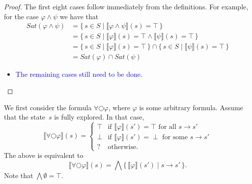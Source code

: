 \documentclass[12pt]{article}
\newcommand{\nxt}{\bigcirc}
\theoremstyle{definition}
\newcommand{\satisfaction}[1]{\llbracket #1 \rrbracket}
\begin{document}
\color{red}
\begin{proof}
The first eight cases follow immediately from the definitions.  For example, for the case $\varphi \wedge \psi$ we have that
\begin{align*}
\mathit{Sat}(\varphi \wedge \psi) 
& = \{\, s \in S \mid \satisfaction{\varphi \wedge \psi}(s) = \top \,\}\\
& = \{\, s \in S \mid \satisfaction{\varphi}(s) = \top \wedge \satisfaction{\psi}(s) = \top \,\}\\
& = \{\, s \in S \mid \satisfaction{\varphi}(s) = \top \,\} \cap \{\, s \in S \mid \satisfaction{\psi}(s) = \top \,\}\\
& = \mathit{Sat}(\varphi) \cap \mathit{Sat}(\psi)
\end{align*}
\begin{itemize}
\item 
\textcolor{blue}{The remaining cases still need to be done.}
\end{itemize}

\end{proof}
\color{black}

We first consider the formula $\forall \nxt \varphi$, where $\varphi$ is some arbitrary formula.  Assume that the state~$s$ is fully explored.  In that case,
\[
\satisfaction{\forall \nxt \varphi}(s) = \left \{
\begin{array}{ll}
\top & \mbox{if $\satisfaction{\varphi}(s') = \top$ for all $s \rightarrow s'$}\\
\perp & \mbox{if $\satisfaction{\varphi}(s') = \perp$ for some $s \rightarrow s'$}\\
? & \mbox{otherwise.}
\end{array}
\right .
\]
The above is equivalent to
\[
\satisfaction{\forall \nxt \varphi}(s) = \bigwedge \{\, \satisfaction{\varphi}(s') \mid s \rightarrow s' \,\}.
\]
Note that $\bigwedge \emptyset = \top$.
\end{document}
